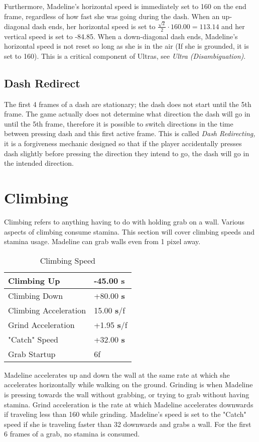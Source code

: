 \documentclass[oneside]{book}
\newcommand{\s}{\textbf{s}}
\begin{document}
Furthermore, Madeline's horizontal speed is immediately set to 160 on the end frame, regardless of how fast she was going during the dash. When an up-diagonal dash ends, her horizontal speed is set to $\frac{\sqrt{2}}{2}\cdot 160.00=113.14$ and her vertical speed is set to -84.85. When a down-diagonal dash ends, Madeline's horizontal speed is not reset so long as she is in the air (If she is grounded, it is set to 160). This is a critical component of Ultras, see \textit{Ultra (Disambiguation)}.

\subsection{Dash Redirect}

The first 4 frames of a dash are stationary; the dash does not start until the 5th frame. The game actually does not determine what direction the dash will go in until the 5th frame, therefore it is possible to switch directions in the time between pressing dash and this first active frame. This is called \textit{Dash Redirecting,} it is a forgiveness mechanic designed so that if the player accidentally presses dash slightly before pressing the direction they intend to go, the dash will go in the intended direction.

\section{Climbing}

Climbing refers to anything having to do with holding grab on a wall. Various aspects of climbing consume stamina. This section will cover climbing speeds and stamina usage. Madeline can grab walls even from 1 pixel away.

\begin{table}[h]
\begin{tabular}{|l|l|}
\hline
Climbing Up&-45.00 \s\\
\hline
Climbing Down&+80.00 \s\\
\hline
Climbing Acceleration&15.00 \s/f\\
\hline
Grind Acceleration&+1.95 \s/f\\
\hline
"Catch" Speed&+32.00 \s\\
\hline
Grab Startup& 6f\\
\hline
\end{tabular}
\caption{Climbing Speed}
\end{table}

Madeline accelerates up and down the wall at the same rate at which she accelerates horizontally while walking on the ground. Grinding is when Madeline is pressing towards the wall without grabbing, or trying to grab without having stamina. Grind acceleration is the rate at which Madeline accelerates downwards if traveling less than 160 while grinding. Madeline's speed is set to the "Catch" speed if she is traveling faster than 32 downwards and grabs a wall. For the first 6 frames of a grab, no stamina is consumed.
\end{document}
